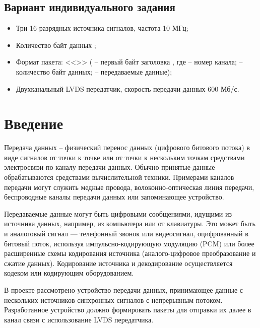 \subsection*{Вариант индивидуального задания}

\begin{itemize}
	\item Три 16-разрядных источника сигналов, частота 10 МГц;
	\item Количество байт данных ;
	\item Формат пакета: <<>> ( -- первый байт заголовка , где  -- номер канала;  -- количество байт данных;  -- передаваемые данные);
 	\item Двухканальный LVDS передатчик, скорость передачи данных $600$ Мб/с.
\end{itemize}

\newpage

\section*{Введение}

Передача данных -- физический перенос данных (цифрового битового потока) в виде сигналов от точки к точке или от точки к нескольким точкам средствами электросвязи по каналу передачи данных. Обычно принятые данные обрабатываются средствами вычислительной техники. Примерами каналов передачи могут служить медные провода, волоконно-оптическая линия передачи, беспроводные каналы передачи данных или запоминающее устройство.

Передаваемые данные могут быть цифровыми сообщениями, идущими из источника данных, например, из компьютера или от клавиатуры. Это может быть и аналоговый сигнал — телефонный звонок или видеосигнал, оцифрованный в битовый поток, используя импульсно-кодирующую модуляцию (PCM) или более расширенные схемы кодирования источника (аналого-цифровое преобразование и сжатие данных). Кодирование источника и декодирование осуществляется кодеком или кодирующим оборудованием.

В проекте рассмотрено устройство передачи данных, принимающее данные с нескольких источников синхронных сигналов с непрерывным потоком. Разработанное устройство должно формировать пакеты для отправки их далее в канал связи с использование LVDS передатчика.

\newpage

